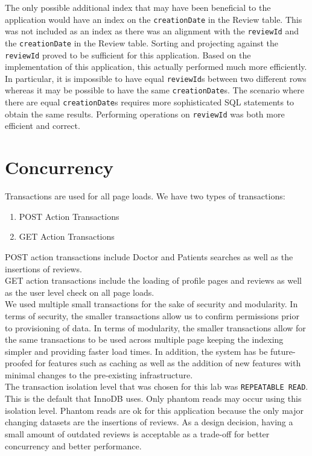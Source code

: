 \documentclass{article}
\begin{document}
The only possible additional index that may have been beneficial to the application would have an index on the \texttt{creationDate} in the Review table. This was not included as an index as there was an alignment with the \texttt{reviewId} and the \texttt{creationDate} in the Review table. Sorting and projecting against the \texttt{reviewId} proved to be sufficient for this application. Based on the implementation of this application, this actually performed much more efficiently. In particular, it is impossible to have equal \texttt{reviewId}s between two different rows whereas it may be possible to have the same \texttt{creationDate}s. The scenario where there are equal \texttt{creationDate}s requires more sophisticated SQL statements to obtain the same results. Performing operations on \texttt{reviewId} was both more efficient and correct.

\section{Concurrency}
Transactions are used for all page loads. We have two types of transactions:
\begin{enumerate}
	\item POST Action Transactions
	\item GET Action Transactions
\end{enumerate}
POST action transactions include Doctor and Patients searches as well as the insertions of reviews. \\

GET action transactions include the loading of profile pages and reviews as well as the user level check on all page loads. \\

We used multiple small transactions for the sake of security and modularity. In terms of security, the smaller transactions allow us to confirm permissions prior to provisioning of data. In terms of modularity, the smaller transactions allow for the same transactions to be used across multiple page keeping the indexing simpler and providing faster load times. In addition, the system has be future-proofed for features such as caching as well as the addition of new features with minimal changes to the pre-existing infrastructure. \\

The transaction isolation level that was chosen for this lab was \texttt{REPEATABLE READ}. This is the default that InnoDB uses. Only phantom reads may occur using this isolation level. Phantom reads are ok for this application because the only major changing datasets are the insertions of reviews. As a design decision, having a small amount of outdated reviews is acceptable as a trade-off for better concurrency and better performance. \\
\end{document}
